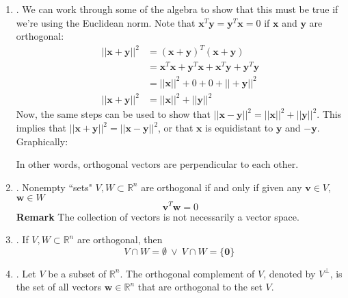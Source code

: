 \documentclass[12pt]{article}
\begin{document}
\begin{enumerate}
\begin{enumerate}
	\item\underline{}.
		We can work through some of the algebra to show that this must be true if we're using the Euclidean norm. Note
		that $\mathbf{x}^T\mathbf{y}=\mathbf{y}^T\mathbf{x}=0$ if $\mathbf{x}$ and $\mathbf{y}$ are orthogonal:
		\begin{align*}
			||\mathbf{x}+\mathbf{y}||^2 & = (\mathbf{x}+\mathbf{y})^T(\mathbf{x}+\mathbf{y}) \\
			& = \mathbf{x}^T\mathbf{x}+\mathbf{y}^T\mathbf{x}+\mathbf{x}^T\mathbf{y}+\mathbf{y}^T\mathbf{y} \\
			& = ||\mathbf{x}||^2 + 0 + 0 +||+\mathbf{y}||^2 \\
			||\mathbf{x}+\mathbf{y}||^2 & = ||\mathbf{x}||^2 + ||\mathbf{y}||^2
		\end{align*}
		Now, the same steps can be used to show that $||\mathbf{x}-\mathbf{y}||^2=||\mathbf{x}||^2+||\mathbf{y}||^2$. This
		implies that $||\mathbf{x}+\mathbf{y}||^2=||\mathbf{x}-\mathbf{y}||^2$, or that $\mathbf{x}$ is equidistant
		to $\mathbf{y}$ and $-\mathbf{y}$. Graphically:
		\begin{center}
		\end{center}
		In other words, orthogonal vectors are perpendicular to each other.
		
		\item\underline{}.
			Nonempty ``sets" $V,W \subset \mathbb{R}^n$ are orthogonal if and only if given any $\mathbf{v} \in V$, $\mathbf{w} \in W$ 
			\[ \mathbf{v}^T \mathbf{w} = 0 \]
			\textbf{Remark} The collection of vectors is not necessarily a vector space. 
			
		\item\underline{}. 
		If $V,W \subset \mathbb{R}^n$ are orthogonal, then
			\[ V \cap W = \emptyset \ \vee \ V \cap W =\{\mathbf{0}\}\ \]
		
		\item\underline{}.
			Let $V$ be a subset of $\mathbb{R}^n$. The orthogonal complement of $V$, denoted by $V^\perp$, is the set of all vectors $\mathbf{w} \in \mathbb{R}^n$ that are orthogonal to the set $V$.
		

\end{enumerate}
\end{enumerate}
\end{document}
